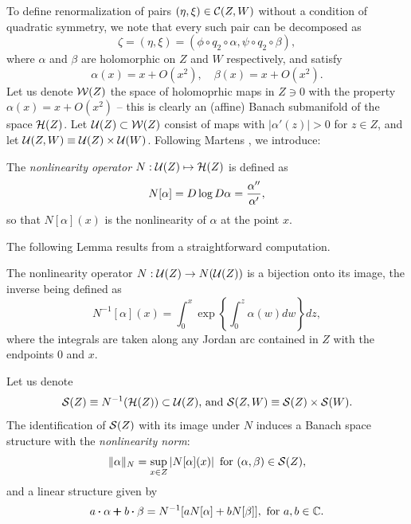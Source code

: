To define renormalization of pairs $(\eta,\xi)\in\mathcal{C}(Z,W)$ without a condition of quadratic symmetry, we note that every 
such pair can be decomposed as 
\begin{equation}\label{def:acm}
\zeta=(\eta,\xi)=(\phi \circ q_2 \circ \alpha,  \psi \circ q_2 \circ \beta),
\end{equation}
where $\alpha$ and $\beta$ are holomorphic on $Z$ and $W$ respectively, and satisfy 
\begin{equation}\label{def:tangenttox}
\alpha(x)=x+O(x^2), \quad \beta(x)=x+O(x^2).
\end{equation}
Let us denote $\mathcal{W}(Z)$ the space of holomoprhic maps in $Z\ni 0$ with the property $\alpha(x)=x+O(x^2)$ -- this is clearly an (affine) Banach submanifold of the space $\mathcal{H}(Z)$.
Let $\mathcal{U}(Z)\subset \mathcal{W}(Z)$ consist of maps with $|\alpha'(z)|>0$ for $z\in Z$, and let $\mathcal{U}(Z,W)\equiv \mathcal{U}(Z)\times\mathcal{U}(W)$.
Following Martens \cite{Mar}, we introduce:

\begin{definition}
The {\it nonlinearity operator} $N: \mathcal{U}(Z) \mapsto \mathcal{H}(Z)$
is defined as
$$N[\alpha]=D \log{  D \alpha }={\alpha'' \over \alpha'},$$
so that $N[\alpha](x)$ is the nonlinearity of $\alpha$ at the point $x$.
\end{definition}

\noindent
The following Lemma results from a straightforward computation.

\begin{lemma}
The nonlinearity operator $N:\mathcal{U}(Z)\to N(\mathcal{U}(Z))$ is a bijection onto its image, the inverse being defined as 
\begin{equation}\label{inv_non_op}
N^{-1}[\alpha](x)= \int_0^x \exp\left\{\int_0^z\alpha(w) d w  \right\} d z,
\end{equation}
where the integrals are taken along any Jordan arc contained in $Z$ with the endpoints $0$ and $x$.
\end{lemma}

\noindent
Let us denote $$\mathcal{S}(Z)\equiv N^{-1}(\mathcal{H}(Z))\subset \mathcal{U}(Z)\text{, and }\mathcal{S}(Z,W)\equiv \mathcal{S}(Z)\times\mathcal{S}(W).$$
The identification of $\mathcal{S}(Z)$ with its image under $N$ induces a Banach space structure with the 
{\it nonlinearity norm}:
\begin{equation}
\label{n_lnorm}\|\alpha\|_N=\sup_{x \in Z} \left|N[\alpha](x) \right|\text{ for }(\alpha,\beta)\in \mathcal{S}(Z),
\end{equation}
and a linear structure given by 
\begin{equation} 
\label{nl_lin_struct} a \pmb{\cdot} \alpha \pmb{+} b \pmb{\cdot} \beta=N^{-1}[a  N[\alpha]+b  N[\beta]],\text{ for }a,b\in{\Bbb C}.
\end{equation}

